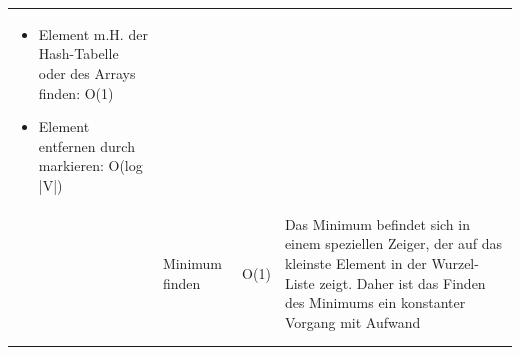 \documentclass{article}
\begin{document}
\begin{table}[H]
\begin{tabular}{p{3.5cm} p{3cm} p{1.5cm} p{6cm}}
        \begin{itemize}
            \item Element m.H. der Hash-Tabelle\index{Hash-Tabelle} oder des Arrays finden: O(1) 
            \item Element entfernen durch markieren: O(log |V|)
        \end{itemize}
        \\ 
         & Minimum finden & O(1) & Das Minimum befindet sich in einem speziellen Zeiger, der auf das kleinste Element in der Wurzel-Liste zeigt. Daher ist das Finden des Minimums ein konstanter Vorgang mit Aufwand \\ \\  \\
    \end{tabular}
    \label{tab:Realisierung einer Priority Queue}
\end{table}
\newpage
\end{document}
